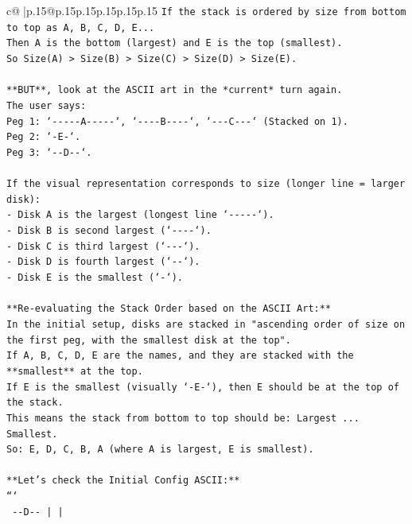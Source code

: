 \documentclass{article}
\begin{document}
{\begin{supertabular}{c@{$\;$}|p{.15\linewidth}@{}p{.15\linewidth}p{.15\linewidth}p{.15\linewidth}p{.15\linewidth}p{.15\linewidth}}
{{{\texttt{If the stack is ordered by size from bottom to top as A, B, C, D, E...} \\
\texttt{Then A is the bottom (largest) and E is the top (smallest).} \\
\texttt{So Size(A) > Size(B) > Size(C) > Size(D) > Size(E).} \\
\\ 
\texttt{**BUT**, look at the ASCII art in the *current* turn again.} \\
\texttt{The user says:} \\
\texttt{Peg 1: `{-}{-}{-}{-}{-}A{-}{-}{-}{-}{-}`, `{-}{-}{-}{-}B{-}{-}{-}{-}`, `{-}{-}{-}C{-}{-}{-}` (Stacked on 1).} \\
\texttt{Peg 2: `{-}E{-}`.} \\
\texttt{Peg 3: `{-}{-}D{-}{-}`.} \\
\\ 
\texttt{If the visual representation corresponds to size (longer line = larger disk):} \\
\texttt{{-} Disk A is the largest (longest line `{-}{-}{-}{-}{-}`).} \\
\texttt{{-} Disk B is second largest (`{-}{-}{-}{-}`).} \\
\texttt{{-} Disk C is third largest (`{-}{-}{-}`).} \\
\texttt{{-} Disk D is fourth largest (`{-}{-}`).} \\
\texttt{{-} Disk E is the smallest (`{-}`).} \\
\\ 
\texttt{**Re{-}evaluating the Stack Order based on the ASCII Art:**} \\
\texttt{In the initial setup, disks are stacked in "ascending order of size on the first peg, with the smallest disk at the top".} \\
\texttt{If A, B, C, D, E are the names, and they are stacked with the **smallest** at the top.} \\
\texttt{If E is the smallest (visually `{-}E{-}`), then E should be at the top of the stack.} \\
\texttt{This means the stack from bottom to top should be: Largest ... Smallest.} \\
\texttt{So: E, D, C, B, A (where A is largest, E is smallest).} \\
\\ 
\texttt{**Let's check the Initial Config ASCII:**} \\
\texttt{```} \\
\texttt{   {-}{-}D{-}{-}         |           |     } \\
}}}
\end{supertabular}}
\end{document}
